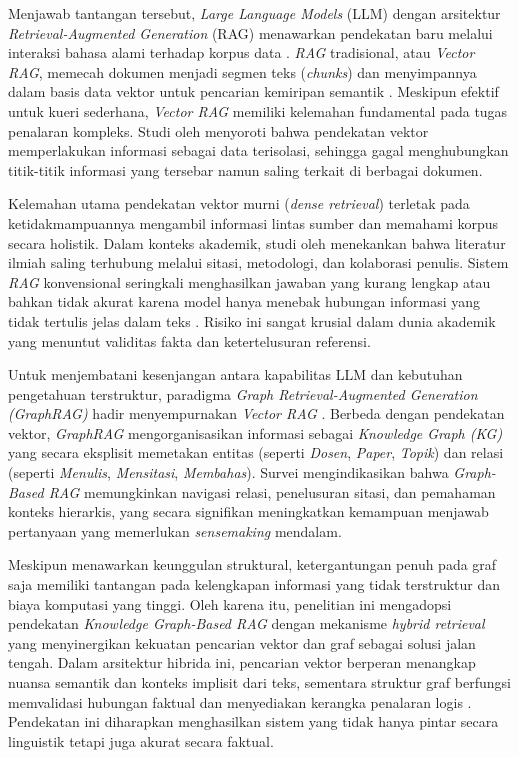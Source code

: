 Menjawab tantangan tersebut, \textit{Large Language Models} (LLM) dengan arsitektur \textit{Retrieval-Augmented Generation} (RAG) menawarkan pendekatan baru melalui interaksi bahasa alami terhadap korpus data \citep{lewis2021retrievalaugmentedgenerationknowledgeintensivenlp}. \textit{RAG} tradisional, atau \textit{Vector RAG}, memecah dokumen menjadi segmen teks (\textit{chunks}) dan menyimpannya dalam basis data vektor untuk pencarian kemiripan semantik \citep{gao2024retrievalaugmentedgenerationlargelanguage}. Meskipun efektif untuk kueri sederhana, \textit{Vector RAG} memiliki kelemahan fundamental pada tugas penalaran kompleks. Studi oleh \citet{han2025ragvsgraphragsystematic} menyoroti bahwa pendekatan vektor memperlakukan informasi sebagai data terisolasi, sehingga gagal menghubungkan titik-titik informasi yang tersebar namun saling terkait di berbagai dokumen.

Kelemahan utama pendekatan vektor murni (\textit{dense retrieval}) terletak pada ketidakmampuannya mengambil informasi lintas sumber dan memahami korpus secara holistik. Dalam konteks akademik, studi oleh \citet{10.1145/3155133.3155154} menekankan bahwa literatur ilmiah saling terhubung melalui sitasi, metodologi, dan kolaborasi penulis. Sistem \textit{RAG} konvensional seringkali menghasilkan jawaban yang kurang lengkap atau bahkan tidak akurat karena model hanya menebak hubungan informasi yang tidak tertulis jelas dalam teks \citep{wu2024medicalgraphragsafe}. Risiko ini sangat krusial dalam dunia akademik yang menuntut validitas fakta dan ketertelusuran referensi.

Untuk menjembatani kesenjangan antara kapabilitas LLM dan kebutuhan pengetahuan terstruktur, paradigma \textit{Graph Retrieval-Augmented Generation (GraphRAG)} hadir menyempurnakan \textit{Vector RAG} \citep{edge2025localglobalgraphrag}. Berbeda dengan pendekatan vektor, \textit{GraphRAG} mengorganisasikan informasi sebagai \textit{Knowledge Graph (KG)} yang secara eksplisit memetakan entitas (seperti \textit{Dosen}, \textit{Paper}, \textit{Topik}) dan relasi (seperti \textit{Menulis}, \textit{Mensitasi}, \textit{Membahas}). Survei \citet{peng2024graphretrievalaugmentedgenerationsurvey} mengindikasikan bahwa \textit{Graph-Based RAG} memungkinkan navigasi relasi, penelusuran sitasi, dan pemahaman konteks hierarkis, yang secara signifikan meningkatkan kemampuan menjawab pertanyaan yang memerlukan \textit{sensemaking} mendalam.

Meskipun menawarkan keunggulan struktural, ketergantungan penuh pada graf saja memiliki tantangan pada kelengkapan informasi yang tidak terstruktur dan biaya komputasi yang tinggi. Oleh karena itu, penelitian ini mengadopsi pendekatan \textit{Knowledge Graph-Based RAG} dengan mekanisme \textit{hybrid retrieval} yang menyinergikan kekuatan pencarian vektor dan graf sebagai solusi jalan tengah. Dalam arsitektur hibrida ini, pencarian vektor berperan menangkap nuansa semantik dan konteks implisit dari teks, sementara struktur graf berfungsi memvalidasi hubungan faktual dan menyediakan kerangka penalaran logis \citep{nagori2025opensourceagentichybridrag}. Pendekatan ini diharapkan menghasilkan sistem yang tidak hanya pintar secara linguistik tetapi juga akurat secara faktual.


